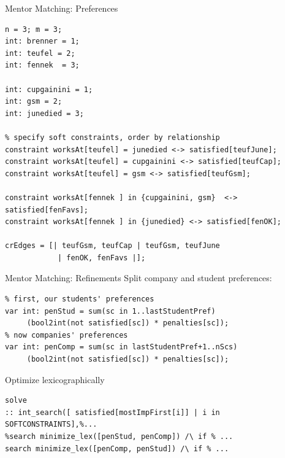 \documentclass[handout,10pt,xcolor={dvipsnames},fleqn]{beamer}
\begin{document}
\begin{frame}[fragile]{Mentor Matching: Preferences}
\begin{lstlisting}
n = 3; m = 3;
int: brenner = 1;
int: teufel = 2;
int: fennek  = 3;

int: cupgainini = 1;
int: gsm = 2;
int: junedied = 3;

% specify soft constraints, order by relationship
constraint worksAt[teufel] = junedied <-> satisfied[teufJune];
constraint worksAt[teufel] = cupgainini <-> satisfied[teufCap];
constraint worksAt[teufel] = gsm <-> satisfied[teufGsm];

constraint worksAt[fennek ] in {cupgainini, gsm}  <-> satisfied[fenFavs];
constraint worksAt[fennek ] in {junedied} <-> satisfied[fenOK];

crEdges = [| teufGsm, teufCap | teufGsm, teufJune 
            | fenOK, fenFavs |];
\end{lstlisting}
\end{frame}

\begin{frame}[fragile]{Mentor Matching: Refinements}
Split company and student preferences:
\begin{lstlisting}
% first, our students' preferences
var int: penStud = sum(sc in 1..lastStudentPref) 
     (bool2int(not satisfied[sc]) * penalties[sc]);
% now companies' preferences
var int: penComp = sum(sc in lastStudentPref+1..nScs)
     (bool2int(not satisfied[sc]) * penalties[sc]);
\end{lstlisting}

\vspace*{3ex}

Optimize lexicographically

\begin{lstlisting}
solve 
:: int_search([ satisfied[mostImpFirst[i]] | i in SOFTCONSTRAINTS],%... 
%search minimize_lex([penStud, penComp]) /\ if % ...
search minimize_lex([penComp, penStud]) /\ if % ...
\end{lstlisting}
\end{frame}
\end{document}
